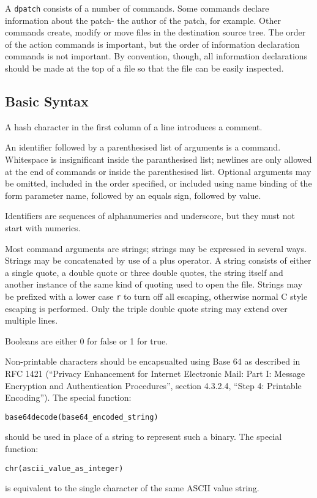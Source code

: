 \documentclass{article}
\begin{document}
A \texttt{dpatch} consists of a number of commands. Some commands
declare information about the patch- the author of the patch, for example. Other commands create, modify or move files in the
destination source tree. The order of the action commands is
important, but the order of information declaration commands is not
important. By convention, though, all information declarations should
be made at the top of a file so that the file can be easily inspected.

\subsection{Basic Syntax}

A hash character in the first column of a line introduces a
comment. 

An identifier followed by a parenthesised list of arguments is a
command. Whitespace is insignificant inside the paranthesised list;
newlines are only allowed at the end of commands or inside the
parenthesised list. Optional arguments may be omitted, included in the
order specified, or included using name binding of the form parameter
name, followed by an equals sign, followed by value.

Identifiers are sequences of alphanumerics and underscore, but they
must not start with numerics.

Most command arguments are strings; strings may be expressed in
several ways. Strings may be concatenated by use of a plus operator. A
string consists of either a single quote, a double quote or three
double quotes, the string itself and another instance of the same kind
of quoting used to open the file. Strings may be prefixed with a lower
case \texttt{r} to turn off all escaping, otherwise normal C style escaping is
performed. Only the triple double quote string may extend over multiple
lines.

Booleans are either 0 for false or 1 for true.

Non-printable characters should be encapsualted using Base 64 as described in RFC
1421 (``Privacy Enhancement for Internet Electronic Mail: Part I:
Message Encryption and Authentication Procedures'', section 4.3.2.4,
``Step 4: Printable Encoding''). The special function:

\begin{verbatim}
base64decode(base64_encoded_string)
\end{verbatim}

should be used in place of a
string to represent such a binary. The special function:
\begin{verbatim}
chr(ascii_value_as_integer)
\end{verbatim}
is equivalent to the single character of
the same ASCII value string.
\end{document}
